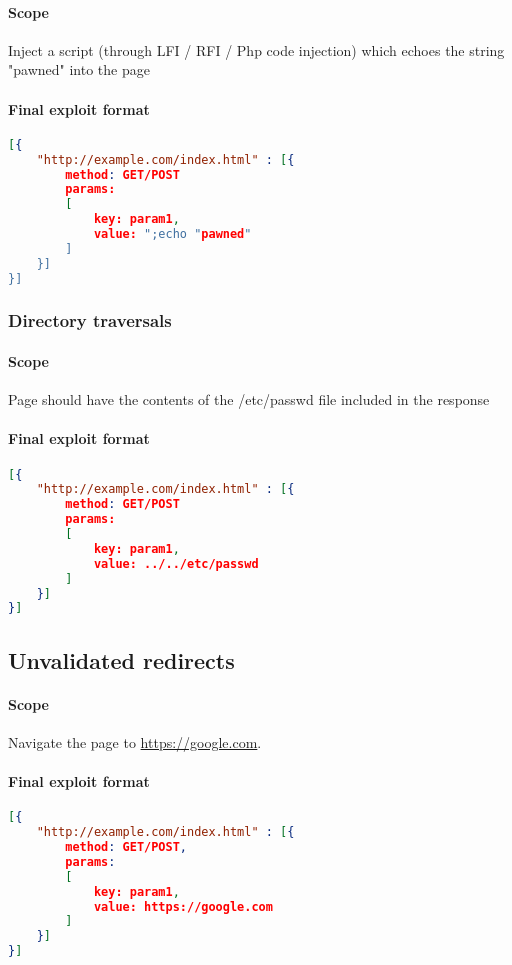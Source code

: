 \documentclass{article}[10pt]
\begin{document}
\paragraph{Scope}
Inject a script (through LFI / RFI / Php code injection) which echoes the string "pawned" into the page

\paragraph{Final exploit format\\}

\begin{lstlisting}[language=json,firstnumber=1]
[{
	"http://example.com/index.html" : [{
		method: GET/POST
		params: 
		[
			key: param1,
			value: ";echo "pawned"
		]
	}]
}]
\end{lstlisting}
\subsubsection{Directory traversals}
\paragraph{Scope}
Page should have the contents of the /etc/passwd file included in the response

\paragraph{Final exploit format\\}
\begin{lstlisting}[language=json,firstnumber=1]
[{
	"http://example.com/index.html" : [{
		method: GET/POST
		params: 
		[
			key: param1,
			value: ../../etc/passwd
		]
	}]
}]
\end{lstlisting}

\subsection{Unvalidated redirects}
\paragraph{Scope}
Navigate the page to \href{https://google.com}{https://google.com}.

\paragraph{Final exploit format\\} 
\begin{lstlisting}[language=json,firstnumber=1]
[{	
	"http://example.com/index.html" : [{
		method: GET/POST,
		params: 
		[
			key: param1,
			value: https://google.com
		]
	}]
}]
\end{lstlisting}
\end{document}
